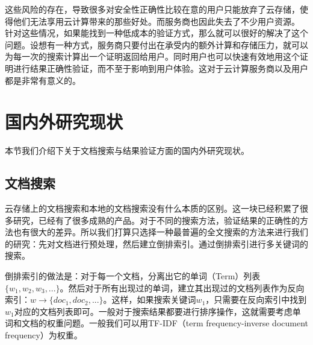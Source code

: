 这些风险的存在，导致很多对安全性正确性比较在意的用户只能放弃了云存储，使得他们无法享用云计算带来的那些好处。而服务商也因此失去了不少用户资源。
针对这些情况，如果能找到一种低成本的验证方式，那么就可以很好的解决了这个问题。设想有一种方式，服务商只要付出在承受内的额外计算和存储压力，就可以为每一次的搜索计算出一个证明返回给用户。同时用户也可以快速有效地用这个证明进行结果正确性验证，而不至于影响到用户体验。这对于云计算服务商以及用户都是非常有意义的。

\section{国内外研究现状}
本节我们介绍下关于文档搜索与结果验证方面的国内外研究现状。

\subsection{文档搜索}
云存储上的文档搜索和本地的文档搜索没有什么本质的区别。这一块已经积累了很多研究，已经有了很多成熟的产品。对于不同的搜索方法，验证结果的正确性的方法也有很大的差异。所以我们打算只选择一种最普遍的全文搜索的方法来进行我们的研究：先对文档进行预处理，然后建立倒排索引。通过倒排索引进行多关键词的搜索。

倒排索引的做法是：对于每一个文档，分离出它的单词（Term）列表$\{w_1,w_2,w_3,...\}$。然后对于所有出现过的单词，建立其出现过的文档列表作为反向索引：$w \to \{doc_1,doc_2,...\}$。这样，如果搜索关键词$w_1$，只需要在反向索引中找到$w_1$对应的文档列表即可。一般对于搜索结果都要进行排序操作，这就需要考虑单词和文档的权重问题。一般我们可以用TF-IDF（term frequency-inverse document frequency）为权重。

